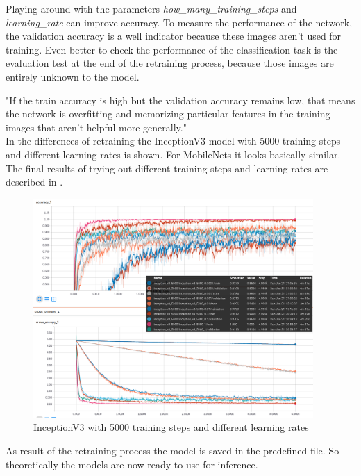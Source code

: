 Playing around with the parameters \textit{how_many_training_steps} and \textit{learning_rate} can improve accuracy. To measure the performance of the network, the validation accuracy is a well indicator because these images aren't used for training. Even better to check the performance of the classification task is the evaluation test at the end of the retraining process, because those images are entirely unknown to the model.

"If the train accuracy is high but the validation accuracy remains low, that means the network is overfitting and memorizing particular features in the training images that aren't helpful more generally." \citep{TensorFlowRetrain2017} \\

In  the differences of retraining the InceptionV3 model with 5000 training steps and different learning rates is shown. For MobileNets it looks basically similar. The final results of trying out different training steps and learning rates are described in .

\begin{figure}[htbp]
\centering
\includegraphics[width=0.95\textwidth]{includes/inception5000LR}
\caption[InceptionV3 with 5000 training steps and different learning rates]{InceptionV3 with 5000 training steps and different learning rates}
\label{fig:inception5000LR}
\end{figure}


As result of the retraining process the model is saved in the predefined file. So theoretically the models are now ready to use for inference. \\




